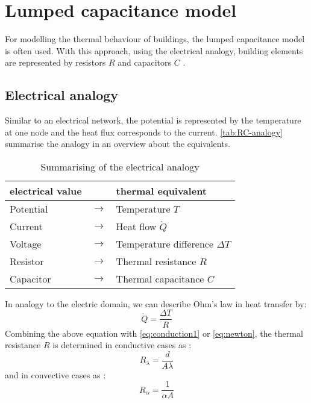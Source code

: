 \section{Lumped capacitance model}
\label{section:modelling}
For modelling the thermal behaviour of buildings, the lumped capacitance model is often used. With this approach, using the electrical analogy, building elements are represented by resistors $R$ and capacitors $C$ \cite{Kramer.2012}. 

\subsection{Electrical analogy}
\label{electricalanalogy}

    Similar to an electrical network, the potential is represented by the temperature at one node and the heat flux corresponds to the current. \autoref{tab:RC-analogy} summarise the analogy in an overview about the equivalents.
    \begin{table}[h]
        \centering
        \begin{tabular}{l c l}
             electrical value & &thermal equivalent\\
             \hline
             Potential & $\rightarrow$ & Temperature $T$\\
             Current & $\rightarrow$ & Heat flow $\dot{Q}$\\
             Voltage & $\rightarrow$& Temperature difference $\Delta T$\\
             Resistor & $\rightarrow$& Thermal resistance $R$\\
             Capacitor & $\rightarrow$& Thermal capacitance $C$\\
        \end{tabular}
        \caption{Summarising of the electrical analogy}
        \label{tab:RC-analogy}
    \end{table}
    
    In analogy to the electric domain, we can describe Ohm's law in heat transfer by:  
     \begin{equation}
    \label{eq:Ohm}
        \dot{Q} = \frac{\Delta T}{R} 
    \end{equation}
    Combining the above equation with \autoref{eq:conduction1} or \autoref{eq:newton}, the thermal resistance $R$ is determined in conductive cases as \cite{Kuchling.2007}:
    \begin{equation}
    \label{eq:r_lambda}
        R_\lambda = \frac{d}{A\lambda}
    \end{equation}
   and in convective cases as \cite{Griesinger.2019}:
    \begin{equation}
        R_\alpha = \frac{1}{\alpha A}
    \end{equation}
    
